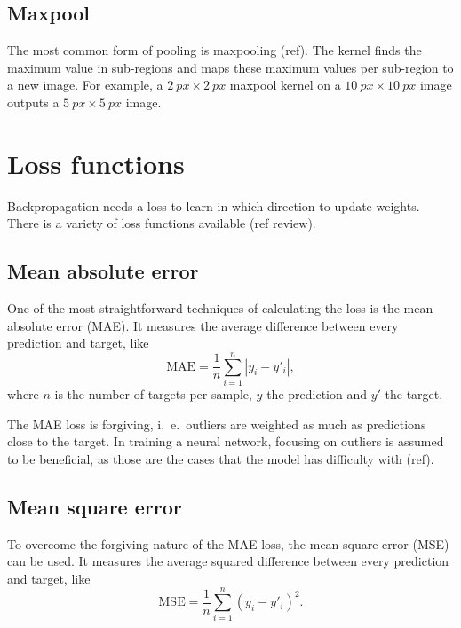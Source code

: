 \subsection{Maxpool}\label{subsec:maxpool}
The most common form of pooling is maxpooling (ref).
The kernel finds the maximum value in sub-regions and maps these maximum values per sub-region to a new image.
For example, a $\SI{2}{px}\times\SI{2}{px}$ maxpool kernel on a $\SI{10}{px}\times\SI{10}{px}$ image outputs a $\SI{5}{px}\times\SI{5}{px}$ image.




\section{Loss functions}
Backpropagation needs a loss to learn in which direction to update weights.
There is a variety of loss functions available (ref review).

\subsection{Mean absolute error}
One of the most straightforward techniques of calculating the loss is the mean absolute error (MAE).
It measures the average difference between every prediction and target, like
\begin{equation}
    \mathrm{MAE} = \frac{1}{n} \sum_{i=1}^{n} |y_i - y'_i|,
\end{equation}
where $n$ is the number of targets per sample, $y$ the prediction and $y'$ the target.

The MAE loss is forgiving, i.\ e.\ outliers are weighted as much as predictions close to the target.
In training a neural network, focusing on outliers is assumed to be beneficial, as those are the cases that the model has difficulty with (ref).

\subsection{Mean square error}
To overcome the forgiving nature of the MAE loss, the mean square error (MSE) can be used.
It measures the average squared difference between every prediction and target, like
\begin{equation}
    \mathrm{MSE} = \frac{1}{n} \sum_{i=1}^n (y_i - y'_i)^2.
\end{equation}

